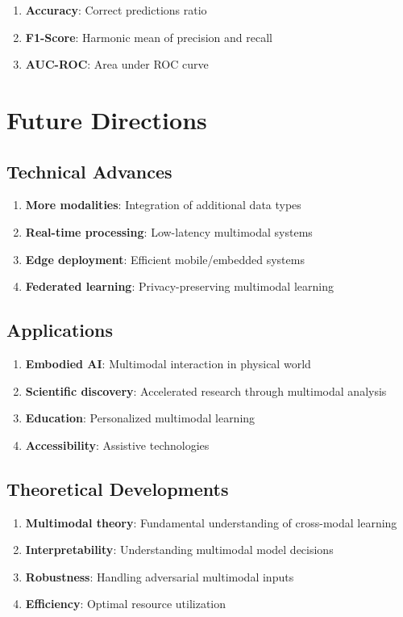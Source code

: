 \documentclass[11pt,a4paper]{article}
\begin{document}
\begin{enumerate}
\item \textbf{Accuracy}: Correct predictions ratio
\item \textbf{F1-Score}: Harmonic mean of precision and recall
\item \textbf{AUC-ROC}: Area under ROC curve
\end{enumerate}

\section{Future Directions}

\subsection{Technical Advances}

\begin{enumerate}
\item \textbf{More modalities}: Integration of additional data types
\item \textbf{Real-time processing}: Low-latency multimodal systems
\item \textbf{Edge deployment}: Efficient mobile/embedded systems
\item \textbf{Federated learning}: Privacy-preserving multimodal learning
\end{enumerate}

\subsection{Applications}

\begin{enumerate}
\item \textbf{Embodied AI}: Multimodal interaction in physical world
\item \textbf{Scientific discovery}: Accelerated research through multimodal analysis
\item \textbf{Education}: Personalized multimodal learning
\item \textbf{Accessibility}: Assistive technologies
\end{enumerate}

\subsection{Theoretical Developments}

\begin{enumerate}
\item \textbf{Multimodal theory}: Fundamental understanding of cross-modal learning
\item \textbf{Interpretability}: Understanding multimodal model decisions
\item \textbf{Robustness}: Handling adversarial multimodal inputs
\item \textbf{Efficiency}: Optimal resource utilization
\end{enumerate}
\end{document}
